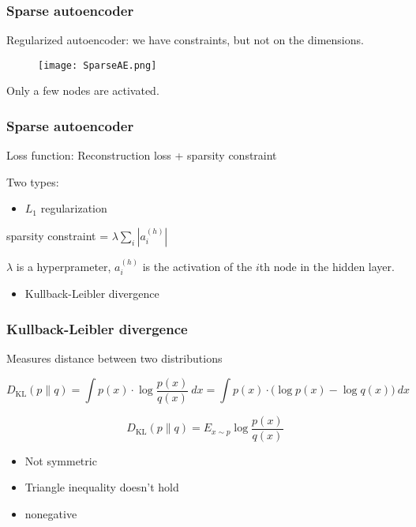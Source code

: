 \documentclass[t]{beamer}
\begin{document}
\begin{frame}
  \frametitle{Sparse autoencoder}

  Regularized autoencoder: we have constraints, but not on
  the dimensions. 

  \begin{figure}
    \texttt{[image: SparseAE.png]}
  \end{figure}

  Only a few nodes are activated. 
\end{frame}


\begin{frame}
  \frametitle{Sparse autoencoder}

  Loss function: Reconstruction loss + sparsity constraint

  \vspace{15pt}

  Two types:

  \begin{itemize}
  \item $L_1$ regularization
  \end{itemize}

  \vspace{10pt}

  sparsity constraint = $\lambda \sum_{i}|a_i^{(h)}|$

  \vspace{10pt}

  $\lambda$ is a hyperprameter, $a_i^{(h)}$ is the activation of
  the $i$th node in the hidden layer.

  \vspace{10pt}

  \begin{itemize}
  \item Kullback-Leibler divergence
  \end{itemize}

\end{frame}

\begin{frame}
  \frametitle{Kullback-Leibler divergence}

  Measures distance between two distributions

  \[
  D_{\text{KL}}(p \| q) = \int p(x)\cdot \log
  \frac{p(x)}{q(x)}\ dx = \int p(x)\cdot \big(\log p(x) - \log
  q(x)\big)\ dx
\]

\[
  D_{\text{KL}}(p \| q) = E_{x\sim p} \log \frac{p(x)}{q(x)}
\]

\begin{itemize}
  \item Not symmetric
  \item Triangle inequality doesn't hold
  \item nonegative
  \end{itemize}

\end{frame}
\end{document}
